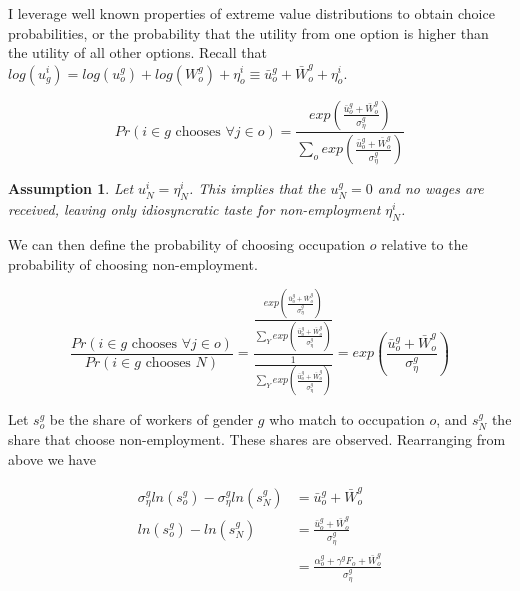 \documentclass[12pt]{article}
\newtheorem{assumption}{Assumption}
\begin{document}
I leverage well known properties of extreme value distributions to obtain choice probabilities, or the probability that the utility from one option is higher than the utility of all other options. Recall that $log(u^i_g) = log(u^g_o) + log(W^g_o)  + \eta^i_o \equiv  \bar{u}^{g}_o + \bar{W}^g_o   + \eta^i_o  $.


$$ Pr(i \in g \text{ chooses } \forall  j \in o) = \frac{exp(\frac{\bar{u}^{g}_o + \bar{W}^g_o}{\sigma^g_{\eta}})}{\sum_o exp(\frac{\bar{u}^{g}_o + \bar{W}^g_o}{\sigma^g_{\eta}})}$$


\begin{assumption}
Let $u^i_N = \eta^i_N$. This implies that the $u^g_N=0$ and no wages are received, leaving only idiosyncratic taste for non-employment $\eta^i_N$.
\end{assumption}


We can then define the probability of choosing occupation $o$ relative to the probability of choosing non-employment.

$$ \frac{Pr(i \in g \text{ chooses } \forall j \in o)}{ Pr(i \in g \text{ chooses }N)}= \frac{ \frac{exp(\frac{\bar{u}^{g}_o + \bar{W}^g_o}{\sigma^g_{\eta}})}{\sum_Y exp(\frac{\bar{u}^{g}_o + \bar{W}^g_o}{\sigma^g_{\eta}})}  } {\frac{1}{\sum_Y exp(\frac{\bar{u}^{g}_o + \bar{W}^g_o}{\sigma^g_{\eta}})} } = exp(\frac{\bar{u}^{g}_o + \bar{W}^g_o}{\sigma^g_{\eta}})$$

Let $s^g_o$ be the share of workers of gender $g$ who match to occupation $o$, and $s^g_N$ the share that choose non-employment. These shares are observed. Rearranging from above we have

\begin{align} \label{logit}
  \sigma^g_{\eta} ln(s^g_o) -  \sigma^g_{\eta} ln(s^g_N) &= \bar{u}^{g}_o + \bar{W}^g_o \\
     ln(s^g_o) - ln(s^g_N) &= \frac{\bar{u}^{g}_o + \bar{W}^g_o}{ \sigma^g_{\eta} } \\
     &= \frac{\alpha^{g}_o + \gamma^g F_o + \bar{W}^g_o}{ \sigma^g_{\eta} }
\end{align}
\end{document}
